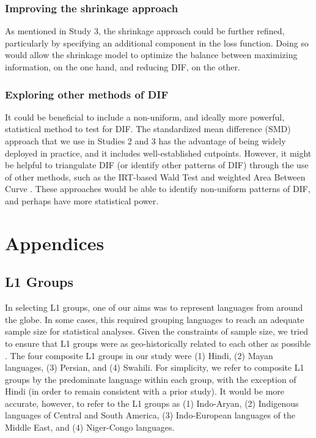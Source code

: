 \documentclass [PhD] {uclathes}
\begin{document}
\subsection{Improving the shrinkage approach}

As mentioned in Study 3, the shrinkage approach could be further refined, particularly by specifying an additional component in the loss function. Doing so would allow the shrinkage model to optimize the balance between maximizing information, on the one hand, and reducing DIF, on the other.

\subsection{Exploring other methods of DIF}

It could be beneficial to include a non-uniform, and ideally more powerful, statistical method to test for DIF. The standardized mean difference (SMD) approach that we use in Studies 2 and 3 has the advantage of being widely deployed in practice, and it includes well-established cutpoints. However, it might be helpful to triangulate DIF (or identify other patterns of DIF) through the use of other methods, such as the IRT-based Wald Test \citep{woods2013} and weighted Area Between Curve \citep[wABC;][]{hansen2014methodology}. These approaches would be able to identify non-uniform patterns of DIF, and perhaps have more statistical power. 



\chapter{Appendices}

\section{L1 Groups}
\label{sec:appendix_lang}

In selecting L1 groups, one of our aims was to represent languages from around the globe. In some cases, this required grouping languages to reach an adequate sample size for statistical analyses. Given the constraints of sample size, we tried to ensure that L1 groups were as geo-historically related to each other as possible \citep{brown2005encyclopedia}. The four composite L1 groups in our study were (1) Hindi, (2) Mayan languages, (3) Persian, and (4) Swahili. For simplicity, we refer to composite L1 groups by the predominate language within each group, with the exception of Hindi (in order to remain consistent with a prior study). It would be more accurate, however, to refer to the L1 groups as (1) Indo-Aryan, (2) Indigenous languages of Central and South America, (3) Indo-European languages of the Middle East, and (4) Niger-Congo languages. 
\end{document}
